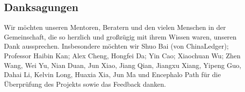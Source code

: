 \documentclass[UTF8,nofonts]{article}
\begin{document}
\begin{multicols}{2}
\section{Danksagungen}
Wir möchten unseren Mentoren, Beratern und den vielen Menschen in der Gemeinschaft, die so herzlich und großzügig mit ihrem Wissen waren, unseren Dank aussprechen. Insbesondere möchten wir Shuo Bai (von ChinaLedger); Professor Haibin Kan; Alex Cheng, Hongfei Da; Yin Cao; Xiaochuan Wu; Zhen Wang, Wei Yu, Nian Duan, Jun Xiao, Jiang Qian, Jiangxu Xiang, Yipeng Guo, Dahai Li, Kelvin Long, Huaxia Xia, Jun Ma und Encephalo Path für die Überprüfung des Projekts sowie das Feedback danken.






\end{multicols}
\end{document}
